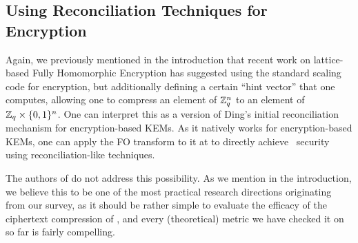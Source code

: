 \subsection{Using Reconciliation Techniques for Encryption}\label{ssec: enc-rec}
Again, we previously mentioned in the introduction that recent work \cite{TCC:BDGM19} on lattice-based Fully Homomorphic Encryption has suggested using the standard scaling code for encryption, but additionally defining a certain ``hint vector'' that one computes, allowing one to compress an element of $\mathbb{Z}_q^n$ to an element of $\mathbb{Z}_q\times \{0,1\}^n$.
One can interpret this as a version of Ding's \cite{EPRINT:Ding12} initial reconciliation mechanism for encryption-based KEMs.
As it natively works for encryption-based KEMs, one can apply the FO transform to it at to directly achieve \indcca\ security using reconciliation-like techniques.

The authors of \cite{TCC:BDGM19} do not address this possibility.
As we mention in the introduction, we believe this to be one of the most practical research directions originating from our survey, as it should be rather simple to evaluate the efficacy of the ciphertext compression of \cite{TCC:BDGM19}, and every (theoretical) metric we have checked it on so far is fairly compelling.